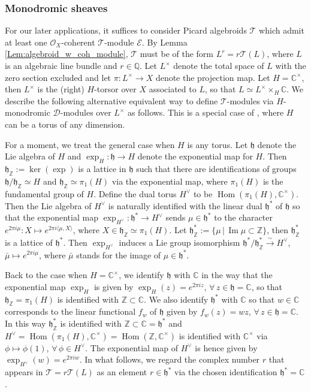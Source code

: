 \documentclass[12pt]{amsart}
\newcommand{\C}{\mathbb{C}}
\newcommand{\Z}{\mathbb{Z}}
\newcommand{\hf}{\mathfrak{h}}
\newcommand{\TT}{\mathscr{T}}
\newcommand{\cm}{\C^\times}
\newcommand{\OO}{\mathcal{O}}
\newcommand{\EE}{\mathcal{E}}
\newcommand{\Hom}{\operatorname{Hom}}
\theoremstyle{definition}
\numberwithin{equation}{section}
\begin{document}
\subsubsection{Monodromic sheaves}\label{SSS:monodromic}

For our later applications, it suffices to consider Picard algebroids $\TT$ which admit at least one $\OO_X$-coherent $\TT$-module $\EE$. By Lemma \ref{Lem:algebroid_w_coh_module}, $\TT$ must be of the form $L^r = r \TT(L)$, where $L$ is an algebraic line bundle and $r \in \mathbb{Q}$. Let $L^\times$ denote the total space of $L$ with the zero section excluded and let $\pi: L^\times \to X$ denote the projection map.  Let $H = \cm$, then $L^\times$ is the (right) $H$-torsor over $X$ associated to $L$, so that $L \simeq L^\times \times_{H} \C$. We describe the following alternative equivalent way to define $\TT$-modules via $H$-monodromic $\mathscr{D}$-modules over $L^\times$ as follows. This is a special case of \cite[Section 2.5.2]{BB}, where $H$ can be a torus of any dimension.

For a moment, we treat the general case when $H$ is any torus. Let $\hf$ denote the Lie algebra of $H$ and $\exp_H: \hf \to H$ denote the exponential map for $H$. Then $\hf_{\Z} := \ker(\exp)$ is a lattice in $\hf$ such that there are identifications of groups $\hf/\hf_\Z \simeq H$ and $\hf_\Z \simeq \pi_1(H)$ via the exponential map, where $\pi_1(H)$ is the fundamental group of $H$.  Define the dual torus $H^\vee$ to be $\Hom(\pi_1(H), \cm)$. Then the Lie algebra of $H^\vee$ is naturally identified with the linear dual $\hf^*$ of $\hf$ so that the exponential map $\exp_{H^\vee}: \hf^* \to H^\vee$ sends $\mu \in \hf^*$ to the character $e^{2\pi i \mu}: X \mapsto e^{2\pi i {\langle \mu, X \rangle}}$, where $X \in \hf_{\Z} \simeq \pi_1(H)$. Let $\hf^*_\Z := \{ \mu \,|\, \operatorname{Im}\mu \subset \Z \}$, then $\hf^*_\Z$ is a lattice of $\hf^*$. Then $\exp_{H^\vee}$ induces a Lie group isomorphism $\hf^*/\hf^*_\Z \xrightarrow{\sim} H^\vee$, $\bar{\mu} \mapsto e^{2\pi i \mu}$,  where $\bar{\mu}$ stands for the image of $\mu\in \hf^*$.

Back to the case when $H=\cm$, we identify $\hf$ with $\C$ in the way that the exponential map $\exp_H$ is given by $\exp_H(z) = e^{2 \pi i z}$, $\forall \, z \in \hf = \C$, so that $\hf_\Z = \pi_1(H)$ is identified with $\Z \subset \C$. We also identify $\hf^*$ with $\C$ so that $w \in \C$ corresponds to the linear functional $f_w$ of $\hf$ given by $f_w(z) = w z$, $\forall \, z \in \hf = \C$. In this way $\hf^*_\Z$ is identified with $\Z \subset \C = \hf^*$ and $H^\vee= \Hom(\pi_1(H), \cm) = \Hom(\Z, \cm)$ is identified with $\cm$ via $\phi \mapsto \phi(1)$, $\forall \, \phi \in H^\vee$. The exponential map of $H^\vee$ is hence given by $\exp_{H^\vee} (w) = e^{2 \pi i w}$. In what follows, we regard the complex number $r$ that appears in $\TT = r \TT(L)$ as an element $r \in \hf^*$ via the chosen identification $\hf^* = \C$.
\end{document}
